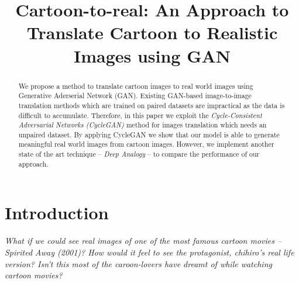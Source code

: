 \documentclass[conference,compsoc]{IEEEtran}
\newcommand\AtPageUpperMyright[1]{\AtPageUpperLeft{%
 \put(\LenToUnit{0.5\paperwidth},\LenToUnit{-1cm}){%
     \parbox{0.5\textwidth}{\raggedleft\fontsize{9}{11}\selectfont #1}}%
 }}%
\newcommand{\conf}[1]{%
\AddToShipoutPictureBG*{%
\AtPageUpperMyright{#1}
}
}
\begin{document}
\title{Cartoon-to-real: An Approach to Translate Cartoon to Realistic Images using GAN}
\author{
}

\maketitle
\begin{abstract}
We propose a method to translate cartoon images to real world images using Generative Aderserial Network (GAN). Existing GAN-based image-to-image translation methods which are trained on paired datasets are impractical as the data is difficult to accumulate. Therefore, in this paper we exploit the \textit{Cycle-Consistent Adversarial Networks (CycleGAN)} method for images translation which needs an unpaired dataset. By applying CycleGAN we show that our model is able to generate meaningful real world images from cartoon images. However, we implement another state of the art technique -- \textit{Deep Analogy} -- to compare the performance of our approach.

\end{abstract}

\IEEEpeerreviewmaketitle

\section{Introduction}
\textit{What if we could see real images of one of the most famous cartoon movies -- Spirited Away (2001)? How would it feel to see the protagonist, chihiro's real life version? Isn't this most of the caroon-lovers have dreamt of while watching cartoon movies? }
\end{document}
